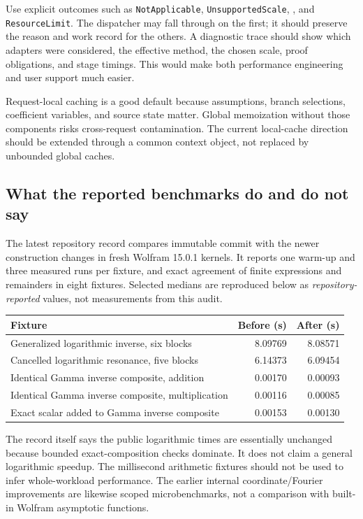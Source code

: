Use explicit outcomes such as \texttt{NotApplicable}, \texttt{UnsupportedScale}, , and \texttt{ResourceLimit}. The dispatcher may fall through on the first; it should preserve the reason and work record for the others. A diagnostic trace should show which adapters were considered, the effective method, the chosen scale, proof obligations, and stage timings. This would make both performance engineering and user support much easier.

Request-local caching is a good default because assumptions, branch selections, coefficient variables, and source state matter. Global memoization without those components risks cross-request contamination. The current local-cache direction should be extended through a common context object, not replaced by unbounded global caches.\cite{commit,inverseexpressions}

\subsection{What the reported benchmarks do and do not say}

The latest repository record compares immutable commit  with the newer construction changes in fresh Wolfram 15.0.1 kernels. It reports one warm-up and three measured runs per fixture, and exact agreement of finite expressions and remainders in eight fixtures. Selected medians are reproduced below as \emph{repository-reported} values, not measurements from this audit.\cite{validation}

\begin{center}
\begin{tabular}{@{}P{9.0cm}rr@{}}
\toprule Fixture & Before (s) & After (s)\\\midrule
Generalized logarithmic inverse, six blocks & 8.09769 & 8.08571\\
Cancelled logarithmic resonance, five blocks & 6.14373 & 6.09454\\
Identical Gamma inverse composite, addition & 0.00170 & 0.00093\\
Identical Gamma inverse composite, multiplication & 0.00116 & 0.00085\\
Exact scalar added to Gamma inverse composite & 0.00153 & 0.00130\\
\bottomrule
\end{tabular}
\end{center}

The record itself says the public logarithmic times are essentially unchanged because bounded exact-composition checks dominate. It does not claim a general logarithmic speedup. The millisecond arithmetic fixtures should not be used to infer whole-workload performance. The earlier internal coordinate/Fourier improvements are likewise scoped microbenchmarks, not a comparison with built-in Wolfram asymptotic functions.\cite{validation}

